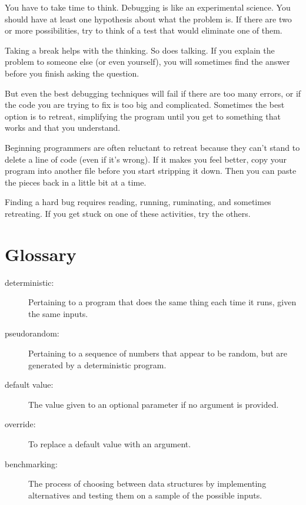 \documentclass[10pt]{book}
\begin{document}
You have to take time to think.  Debugging is like an
experimental science.  You should have at least one hypothesis about
what the problem is.  If there are two or more possibilities, try to
think of a test that would eliminate one of them.

Taking a break helps with the thinking.  So does talking.
If you explain the problem to someone else (or even yourself), you
will sometimes find the answer before you finish asking the question.

But even the best debugging techniques will fail if there are too many
errors, or if the code you are trying to fix is too big and
complicated.  Sometimes the best option is to retreat, simplifying the
program until you get to something that works and that you
understand.

Beginning programmers are often reluctant to retreat because
they can't stand to delete a line of code (even if it's wrong).
If it makes you feel better, copy your program into another file
before you start stripping it down.  Then you can paste the pieces
back in a little bit at a time.

Finding a hard bug requires reading, running, ruminating, and
sometimes retreating.  If you get stuck on one of these activities,
try the others.


\section{Glossary}

\begin{description}

\item[deterministic:] Pertaining to a program that does the same
thing each time it runs, given the same inputs.

\item[pseudorandom:] Pertaining to a sequence of numbers that appear
to be random, but are generated by a deterministic program.

\item[default value:] The value given to an optional parameter if no
argument is provided.

\item[override:] To replace a default value with an argument.

\item[benchmarking:] The process of choosing between data structures
by implementing alternatives and testing them on a sample of the
possible inputs.  

\end{description}
\end{document}
